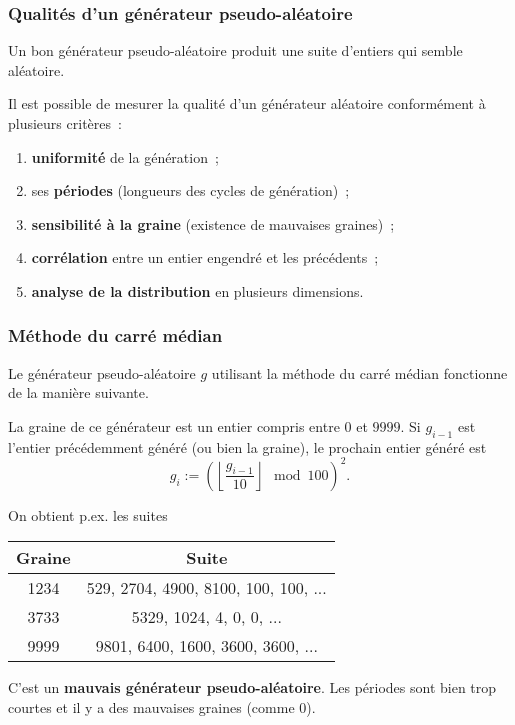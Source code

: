 \begin{frame}[fragile]\frametitle{Qualités d'un générateur pseudo-aléatoire}
Un bon générateur pseudo-aléatoire produit une suite d'entiers qui
semble aléatoire.
\medskip

Il est possible de mesurer la qualité d'un générateur aléatoire conformément
à plusieurs critères~:
\smallskip

\begin{enumerate}
    \item {\bf uniformité} de la génération~;
    \smallskip

    \item ses {\bf périodes} (longueurs des cycles de génération)~;
    \smallskip

    \item {\bf sensibilité à la graine} (existence de mauvaises graines)~;
    \smallskip

    \item {\bf corrélation} entre un entier engendré et les précédents~;
    \smallskip

    \item {\bf analyse de la distribution} en plusieurs dimensions.
\end{enumerate}
\end{frame}

\begin{frame}[fragile]\frametitle{Méthode du carré médian}
Le générateur pseudo-aléatoire $g$ utilisant la
\alert{méthode du carré médian} fonctionne de la manière suivante.
\medskip

La graine de ce générateur est un entier compris entre $0$ et $9999$.
Si $g_{i - 1}$ est l'entier précédemment généré (ou bien la graine), le
prochain entier généré est
\begin{equation*}
    g_i := \left(\left\lfloor \frac{g_{i - 1}}{10} \right\rfloor \mod 100\right)^2.
\end{equation*}

On obtient p.ex. les suites
\begin{center} \footnotesize
    \begin{tabular}{c|c}
        Graine & Suite \\ \hline
        1234 & 529, 2704, 4900, 8100, 100, 100, ... \\
        3733 & 5329, 1024, 4, 0, 0, ... \\
        9999 & 9801, 6400, 1600, 3600, 3600, ...
    \end{tabular}
\end{center}
\medskip

C'est un {\bf mauvais générateur pseudo-aléatoire}. Les périodes sont
bien trop courtes et il y a des mauvaises graines (comme $0$).
\end{frame}

